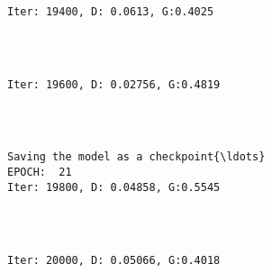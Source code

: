 \documentclass[11pt]{article}
\begin{document}
    \begin{Verbatim}[commandchars=\\\{\}]

Iter: 19400, D: 0.0613, G:0.4025
    \end{Verbatim}

    \begin{center}
    \end{center}
    { \hspace*{\fill} \\}
    
    \begin{Verbatim}[commandchars=\\\{\}]

Iter: 19600, D: 0.02756, G:0.4819
    \end{Verbatim}

    \begin{center}
    \end{center}
    { \hspace*{\fill} \\}
    
    \begin{Verbatim}[commandchars=\\\{\}]

Saving the model as a checkpoint{\ldots}
EPOCH:  21
Iter: 19800, D: 0.04858, G:0.5545
    \end{Verbatim}

    \begin{center}
    \end{center}
    { \hspace*{\fill} \\}
    
    \begin{Verbatim}[commandchars=\\\{\}]

Iter: 20000, D: 0.05066, G:0.4018
    \end{Verbatim}

    \begin{center}
    \end{center}
    { \hspace*{\fill} \\}
    
\end{document}
